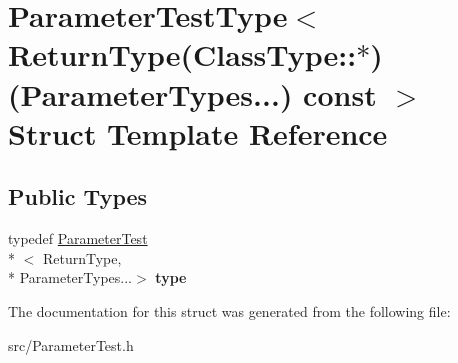 \hypertarget{struct_parameter_test_type_3_01_return_type_07_class_type_1_1_5_08_07_parameter_types_8_8_8_08_01const_01_01_4}{\section{Parameter\-Test\-Type$<$ Return\-Type(Class\-Type\-:\-:$\ast$)(Parameter\-Types...) const $>$ Struct Template Reference}
\label{struct_parameter_test_type_3_01_return_type_07_class_type_1_1_5_08_07_parameter_types_8_8_8_08_01const_01_01_4}
}
\subsection*{Public Types}
\begin{DoxyCompactItemize}
\item 
\hypertarget{struct_parameter_test_type_3_01_return_type_07_class_type_1_1_5_08_07_parameter_types_8_8_8_08_01const_01_01_4_acb7f64e64de66a799b410e51016d1b98}{typedef \hyperlink{class_parameter_test}{Parameter\-Test}\\*
$<$ Return\-Type, \\*
Parameter\-Types...$>$ {\bfseries type}}\label{struct_parameter_test_type_3_01_return_type_07_class_type_1_1_5_08_07_parameter_types_8_8_8_08_01const_01_01_4_acb7f64e64de66a799b410e51016d1b98}

\end{DoxyCompactItemize}


The documentation for this struct was generated from the following file\-:\begin{DoxyCompactItemize}
\item 
src/Parameter\-Test.\-h\end{DoxyCompactItemize}
